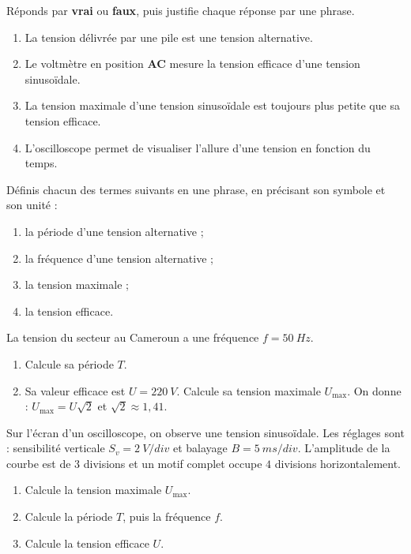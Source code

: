 \documentclass[11pt]{article}
\newcounter{popsec}
\newcounter{popsub}
\newcommand{\courssub}[1]{%
  \stepcounter{popsub}%
  \par\vspace{9pt}\noindent{\popxbold\fontsize{11.5}{13}\selectfont\color{popink}{\color{poporange}\thepopsec.\thepopsub}\hspace{6pt}#1}\par\nopagebreak\vspace{4pt}
}
\begin{document}
\begin{exercice}
Réponds par \textbf{vrai} ou \textbf{faux}, puis justifie chaque réponse par une phrase.
\begin{enumerate}
\item La tension délivrée par une pile est une tension alternative.
\item Le voltmètre en position \textbf{AC} mesure la tension efficace d'une tension sinusoïdale.
\item La tension maximale d'une tension sinusoïdale est toujours plus petite que sa tension efficace.
\item L'oscilloscope permet de visualiser l'allure d'une tension en fonction du temps.
\end{enumerate}
\end{exercice}

\begin{exercice}[Définitions]
Définis chacun des termes suivants en une phrase, en précisant son symbole et son unité :
\begin{enumerate}
\item la période d'une tension alternative ;
\item la fréquence d'une tension alternative ;
\item la tension maximale ;
\item la tension efficace.
\end{enumerate}
\end{exercice}

\begin{exercice}
La tension du secteur au Cameroun a une fréquence $f = \SI{50}{Hz}$.
\begin{enumerate}
\item Calcule sa période $T$.
\item Sa valeur efficace est $U = \SI{220}{V}$. Calcule sa tension maximale $U_{\max}$. On donne : $U_{\max} = U\sqrt{2}$ et $\sqrt{2} \approx 1,41$.
\end{enumerate}
\end{exercice}

\courssub{Je m'entraîne}

\begin{exercice}
Sur l'écran d'un oscilloscope, on observe une tension sinusoïdale. Les réglages sont : sensibilité verticale $S_v = \SI{2}{V/div}$ et balayage $B = \SI{5}{ms/div}$. L'amplitude de la courbe est de $3$ divisions et un motif complet occupe $4$ divisions horizontalement.
\begin{enumerate}
\item Calcule la tension maximale $U_{\max}$.
\item Calcule la période $T$, puis la fréquence $f$.
\item Calcule la tension efficace $U$.
\end{enumerate}
\end{exercice}
\end{document}
